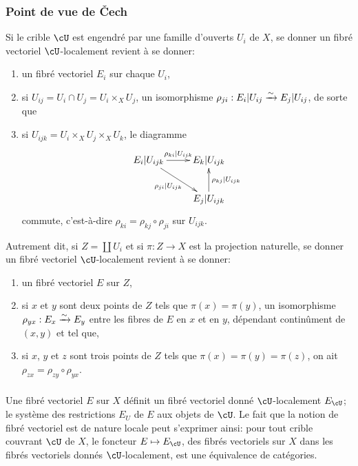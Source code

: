 \subsubsection{Point de vue de Čech}\label{I:1-3-2}

Si le crible $\cU$ est engendré par une famille d'ouverts $U_i$ de $X$, se 
donner un fibré vectoriel $\cU$-localement revient à se donner:
\begin{enumerate}[\indent a)]
  \item un fibré vectoriel $E_i$ sur chaque $U_i$, 
  \item si $U_{ij} = U_i\cap U_j = U_i\times_X U_j$, un isomorphisme 
    $\rho_{ji} : E_i|U_{ij} \xrightarrow\sim E_j|U_{ij}$, de sorte que 
  \item si $U_{ijk} = U_i\times_X U_j\times_X U_k$, le diagramme 
    \[\xymatrix{
      E_i |U_{ijk} \ar[r]^-{\rho_{ki}|U_{ijk}} \ar[dr]_-{\rho_{ji}|U_{ijk}} 
        & E_k|U_{ijk} \\
      & E_j|U_{ijk} \ar[u]_-{\rho_{kj}|U_{ijk}}
    }\]
    commute, c'est-à-dire $\rho_{ki} = \rho_{kj}\circ \rho_{ji}$ sur 
    $U_{ijk}$. 
\end{enumerate}

Autrement dit, si $Z=\coprod U_i$ et si $\pi:Z\to X$ est la projection 
naturelle, se donner un fibré vectoriel $\cU$-localement revient à se donner: 
\begin{enumerate}[\indent a)]
  \item un fibré vectoriel $E$ sur $Z$, 
  \item si $x$ et $y$ sont deux points de $Z$ tels que $\pi(x) = \pi(y)$, un 
    isomorphisme $\rho_{y x}:E_x\xrightarrow\sim E_y$ entre les fibres de $E$ en $x$ et en 
    $y$, dépendant continûment de $(x,y)$ et tel que, 
  \item si $x$, $y$ et $z$ sont trois points de $Z$ tels que 
  $\pi(x)=\pi(y)=\pi(z)$, on ait $\rho_{zx} = \rho_{zy}\circ \rho_{yx}$. 
\end{enumerate}





\subsubsection{}\label{I:1-3-3}

Une fibré vectoriel $E$ sur $X$ définit un fibré vectoriel donné 
$\cU$-localement $E_\cU$; le système des restrictions $E_U$ de $E$ aux objets 
de $\cU$. Le fait que la notion de fibré vectoriel est de nature locale peut 
s'exprimer ainsi: pour tout crible couvrant $\cU$ de $X$, le foncteur 
$E\mapsto E_\cU$, des fibrés vectoriels sur $X$ dans les fibrés vectoriels 
donnés $\cU$-localement, est une équivalence de catégories. 





